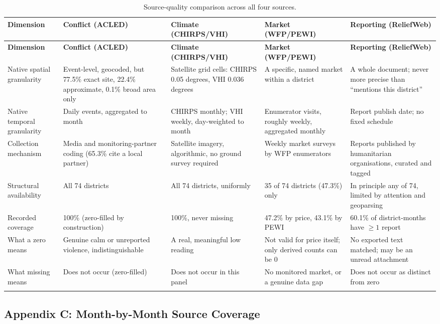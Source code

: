 \documentclass[12pt,a4paper]{article}
\begin{document}
\begingroup
\footnotesize
\begin{longtable}{p{2.0cm}p{2.95cm}p{2.95cm}p{2.95cm}p{2.95cm}}
\toprule
\textbf{Dimension} & \textbf{Conflict (ACLED)} & \textbf{Climate (CHIRPS/VHI)} & \textbf{Market (WFP/PEWI)} & \textbf{Reporting (ReliefWeb)} \\
\midrule
\endfirsthead
\toprule
\textbf{Dimension} & \textbf{Conflict (ACLED)} & \textbf{Climate (CHIRPS/VHI)} & \textbf{Market (WFP/PEWI)} & \textbf{Reporting (ReliefWeb)} \\
\midrule
\endhead
Native spatial granularity & Event-level, geocoded, but 77.5\% exact site, 22.4\% approximate, 0.1\% broad area only & Satellite grid cells: CHIRPS 0.05 degrees, VHI 0.036 degrees & A specific, named market within a district & A whole document; never more precise than ``mentions this district'' \\
Native temporal granularity & Daily events, aggregated to month & CHIRPS monthly; VHI weekly, day-weighted to month & Enumerator visits, roughly weekly, aggregated monthly & Report publish date; no fixed schedule \\
Collection mechanism & Media and monitoring-partner coding (65.3\% cite a local partner) & Satellite imagery, algorithmic, no ground survey required & Weekly market surveys by WFP enumerators & Reports published by humanitarian organisations, curated and tagged \\
Structural availability & All 74 districts & All 74 districts, uniformly & 35 of 74 districts (47.3\%) only & In principle any of 74, limited by attention and geoparsing \\
Recorded coverage & 100\% (zero-filled by construction) & 100\%, never missing & 47.2\% by price, 43.1\% by PEWI & 60.1\% of district-months have $\geq 1$ report \\
What a zero means & Genuine calm or unreported violence, indistinguishable & A real, meaningful low reading & Not valid for price itself; only derived counts can be 0 & No exported text matched; may be an unread attachment \\
What missing means & Does not occur (zero-filled) & Does not occur in this panel & No monitored market, or a genuine data gap & Does not occur as distinct from zero \\
\bottomrule
\caption{Source-quality comparison across all four sources.} \label{tab:appB} \\
\end{longtable}
\endgroup

\subsection*{Appendix C: Month-by-Month Source Coverage}
\end{document}
